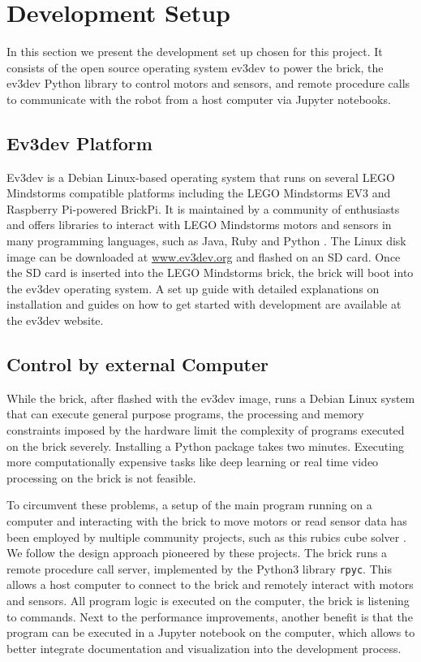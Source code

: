 \documentclass[11pt, a4paper]{article}
\begin{document}
	
	
	\section{Development Setup}
	In this section we present the development set up chosen for this project. It consists of the open source operating system ev3dev to power the brick, the ev3dev Python library to control motors and sensors, and remote procedure calls to communicate with the robot from a host computer via Jupyter notebooks.
	
	\subsection{Ev3dev Platform}
	Ev3dev is a Debian Linux-based operating system that runs on several LEGO Mindstorms compatible platforms including the LEGO Mindstorms EV3 and Raspberry Pi-powered BrickPi. It is maintained by a community of enthusiasts and offers libraries to interact with LEGO Mindstorms motors and sensors in many programming languages, such as Java, Ruby and Python \cite{ev3dev}. The Linux disk image can be downloaded at \href{https://www.ev3dev.org/}{www.ev3dev.org} and flashed on an SD card. Once the SD card is inserted into the LEGO Mindstorms brick, the brick will boot into the ev3dev operating system. A set up guide with detailed explanations on installation and guides on how to get started with development are available at the ev3dev website.
	
	\subsection{Control by external Computer}
	While the brick, after flashed with the ev3dev image, runs a Debian Linux system that can execute general purpose programs, the processing and memory constraints imposed by the hardware limit the complexity of programs executed on the brick severely. Installing a Python package takes two minutes. Executing more computationally expensive tasks like deep learning or real time video processing on the brick is not feasible.
	
	To circumvent these problems, a setup of the main program running on a computer and interacting with the brick to move motors or read sensor data has been employed by multiple community projects, such as this rubics cube solver \cite{ev3_rubics}. We follow the design approach pioneered by these projects. The brick runs a remote procedure call server, implemented by the Python3 library \texttt{rpyc}. This allows a host computer to connect to the brick and remotely interact with motors and sensors. All program logic is executed on the computer, the brick is listening to commands. Next to the performance improvements, another benefit is that the program can be executed in a Jupyter notebook on the computer, which allows to better integrate documentation and visualization into the development process.
	
\end{document}
